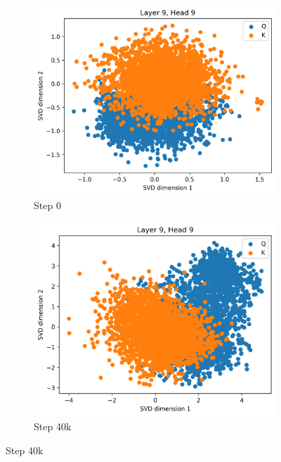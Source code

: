 \begin{figure}[ht]
    \centering
    \begin{subfigure}[b]{0.24\linewidth}
         \includegraphics[width=\linewidth]{sources/part_1/anisotropy/imgs/dist_l9h9_s0_Q.png}
         \caption{Step 0}
         \label{fig:dist_qk_s0_Q}
    \end{subfigure}
    \begin{subfigure}[b]{0.24\linewidth}
         \includegraphics[width=\linewidth]{sources/part_1/anisotropy/imgs/dist_l9h9_s40_Q.png}
         \caption{Step 40k}
         \label{fig:dist_qk_s40_Q}
    \end{subfigure}

\end{figure}
